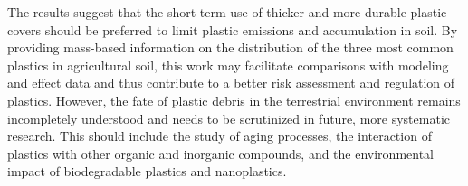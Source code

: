 The results suggest that the short-term use of thicker and more durable plastic covers should be preferred to limit plastic emissions and accumulation in soil.
By providing mass-based information on the distribution of the three most common plastics in agricultural soil, this work may facilitate comparisons with modeling and effect data and thus contribute to a better risk assessment and regulation of plastics. However, the fate of plastic debris in the terrestrial environment remains incompletely understood and needs to be scrutinized in future, more systematic research. This should include the study of aging processes, the interaction of plastics with other organic and inorganic compounds, and the environmental impact of biodegradable plastics and nanoplastics.
